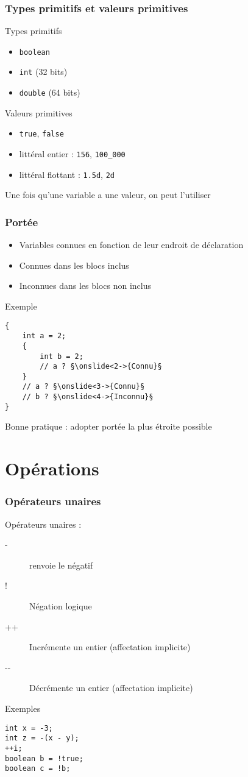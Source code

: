 \documentclass[english, french]{beamer}
\begin{document}
\begin{frame}
	\frametitle{Types primitifs et valeurs primitives}
	\begin{block}{Types primitifs}
		\begin{itemize}
			\item \texttt{boolean}
			\item \texttt{int} (32 bits)
			\item \texttt{double} (64 bits)
		\end{itemize}
	\end{block}
	\begin{block}{Valeurs primitives}
		\begin{itemize}
			\item \texttt{true}, \texttt{false}
			\item littéral entier : \texttt{156}, \texttt{100\_000}
			\item littéral flottant : \texttt{1.5d}, \texttt{2d} 
		\end{itemize}
	\end{block}
	Une fois qu’une variable a une valeur, on peut l’utiliser
\end{frame}

\begin{frame}[fragile]
	\frametitle{Portée}
	\begin{itemize}
		\item Variables connues en fonction de leur endroit de déclaration
		\item Connues dans les blocs inclus
		\item Inconnues dans les blocs non inclus
	\end{itemize}
	\begin{block}{Exemple}
		\begin{lstlisting}
{
	int a = 2;
	{
		int b = 2;
		// a ? §\onslide<2->{Connu}§
	}
	// a ? §\onslide<3->{Connu}§
	// b ? §\onslide<4->{Inconnu}§
}
		\end{lstlisting}	
	\end{block}
	Bonne pratique : adopter portée la plus étroite possible
\end{frame}

\section{Opérations}
\begin{frame}[fragile]
	\frametitle{Opérateurs unaires}
	Opérateurs unaires :
	\begin{description}
		\item[-] renvoie le négatif
		\item[!] Négation logique
		\item[++] Incrémente un entier (affectation implicite)
		\item[-{}-] Décrémente un entier (affectation implicite)
	\end{description}
	\begin{block}{Exemples}
		\begin{lstlisting}
int x = -3;
int z = -(x - y);
++i;
boolean b = !true;
boolean c = !b;
		\end{lstlisting}	
	\end{block}
\end{frame}
\end{document}
